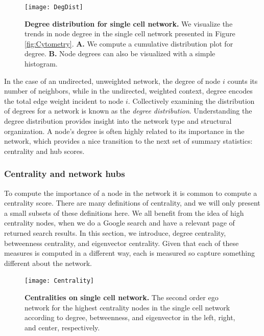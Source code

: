 \begin{figure}
\begin{center}
\texttt{[image: DegDist]}
\caption{{\bf Degree distribution for single cell network.} We visualize the trends in node degree in the single cell network presented in Figure \ref{fig:Cytometry}. {\bf A.} We compute a cumulative distribution plot for degree. {\bf B.} Node degrees can also be visualized with a simple histogram.}
\label{fig:DegDist}
\end{center}
\end{figure}

In the case of an undirected, unweighted network, the degree of node $i$ counts its number of neighbors, while in the undirected, weighted context, degree encodes the total edge weight incident to node $i$. Collectively examining the distribution of degrees for a network is known as the \emph{degree distribution}. Understanding the degree distribution provides insight into the network type and structural organization. A node's degree is often highly related to its importance in the network, which provides a nice transition to the next set of summary statistics: centrality and hub scores.

\subsubsection{Centrality and network hubs}
\indent To compute the importance of a node in the network it is common to compute a centrality score. There are many definitions of centrality, and we will only present a small subsets of these definitions here. We all benefit from the idea of high centrality nodes, when we do a Google search and have a relevant page of returned search results. In this section, we introduce, degree centrality, betweenness centrality, and eigenvector centrality. Given that each of these measures is computed in a different way, each is measured so capture something different about the network. 

 \begin{figure}
\begin{center}
\texttt{[image: Centrality]}
\caption{{\bf Centralities on single cell network.} The second order ego network for the highest centrality nodes in the single cell network according to degree, betweenness, and eigenvector in the left, right, and center, respectively.}
\label{fig:Centrality}
\end{center}
\end{figure}

